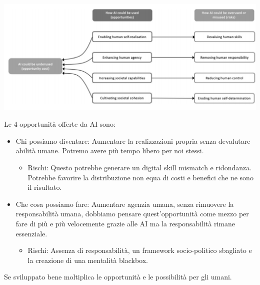 \documentclass[]{article}
\begin{document}
\includegraphics[scale=0.3]{image3.png}

Le 4 opportunità offerte da AI sono:

\begin{itemize}
	\item
	Chi possiamo diventare: Aumentare la realizzazioni propria senza
	devalutare abilità umane. Potremo avere più tempo libero per noi
	stessi.
	
	\begin{itemize}
		 
		\item
		Rischi: Questo potrebbe generare un digital skill mismatch e
		ridondanza. Potrebbe favorire la distribuzione non equa di costi e
		benefici che ne sono il risultato. 
	\end{itemize}
	\item
	Che cosa possiamo fare: Aumentare agenzia umana, senza rimuovere la
	responsabilità umana, dobbiamo pensare quest'opportunità come mezzo
	per fare di più e più velocemente grazie alle AI ma la responsabilità
	rimane essenziale.
	
	\begin{itemize}
		 
		\item
		Rischi: Assenza di responsabilità, un framework socio-politico
		sbagliato e la creazione di una mentalità blackbox.
	\end{itemize}
\end{itemize}

Se sviluppato bene moltiplica le opportunità e le possibilità per gli
umani.
\end{document}
